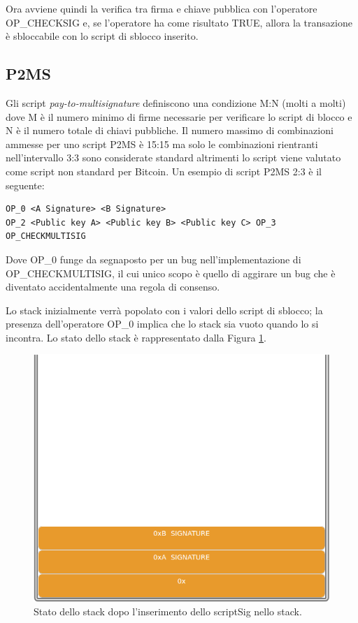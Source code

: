 Ora avviene quindi la verifica tra firma e chiave pubblica con l’operatore OP\_CHECKSIG e, se  l’operatore ha come risultato TRUE, allora la transazione è sbloccabile con lo script di sblocco inserito.

\subsection{P2MS}
Gli script {\it pay-to-multisignature} definiscono una condizione M:N (molti a molti) dove M è il numero minimo di firme necessarie per verificare lo script di blocco e N è il numero totale di chiavi pubbliche.
Il numero massimo di combinazioni ammesse per uno script P2MS è 15:15 ma solo le combinazioni rientranti nell’intervallo 3:3 sono considerate standard altrimenti lo script viene valutato come script non standard per Bitcoin.
Un esempio di script P2MS 2:3 è il seguente:

\begin{lstlisting}[language=bitcoinscript, caption={Script P2MS completo}]
OP_0 <A Signature> <B Signature>
OP_2 <Public key A> <Public key B> <Public key C> OP_3 OP_CHECKMULTISIG
\end{lstlisting}
Dove OP\_0 funge da segnaposto per un bug nell’implementazione di OP\_CHECKMULTISIG, il cui unico scopo è quello di aggirare un bug che è diventato accidentalmente una regola di consenso.

Lo stack inizialmente verrà popolato con i valori dello script di sblocco; la presenza dell’operatore OP\_0 implica che lo stack sia vuoto quando lo si incontra. Lo stato dello stack è rappresentato dalla Figura \ref{fig:stackmultsing01}.

\begin{figure}[h]
\begin{center}
\includegraphics[width=0.6\columnwidth]{images/script/multisig/1.png}
\end{center}
\caption{Stato dello stack dopo l’inserimento dello scriptSig nello stack.}
\label{fig:stackmultsing01}
\end{figure}

